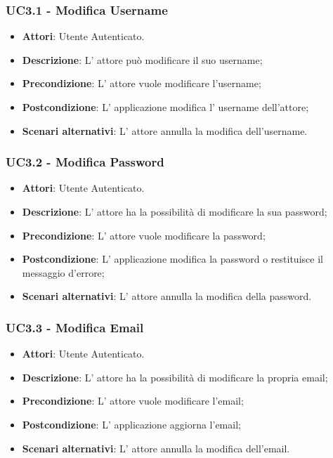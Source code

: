 \subsubsection{UC3.1 - Modifica Username} 
\label{sssec:UC3.1} 
\begin{itemize} 
\item \textbf{Attori}: Utente Autenticato.
\item \textbf{Descrizione}: L' attore può modificare il suo username;
\item \textbf{Precondizione}: L'  attore vuole modificare l'username;
\item \textbf{Postcondizione}: L' applicazione modifica l' username dell'attore;
\item \textbf{Scenari alternativi}: L' attore annulla la modifica dell'username.
\end{itemize} 
\subsubsection{UC3.2 - Modifica Password} 
\label{sssec:UC3.2} 
\begin{itemize} 
\item \textbf{Attori}: Utente Autenticato.
\item \textbf{Descrizione}: L' attore ha la possibilità di modificare la sua password;
\item \textbf{Precondizione}: L'  attore vuole modificare la password;
\item \textbf{Postcondizione}: L' applicazione modifica la password o restituisce il messaggio d'errore;
\item \textbf{Scenari alternativi}: L' attore annulla la modifica della password.
\end{itemize} 
\subsubsection{UC3.3 - Modifica Email} 
\label{sssec:UC3.3} 
\begin{itemize} 
\item \textbf{Attori}: Utente Autenticato.
\item \textbf{Descrizione}: L' attore ha la possibilità di modificare la propria email;
\item \textbf{Precondizione}: L' attore vuole modificare l'email;
\item \textbf{Postcondizione}: L' applicazione aggiorna l'email;
\item \textbf{Scenari alternativi}: L' attore annulla la modifica dell'email.
\end{itemize} 
